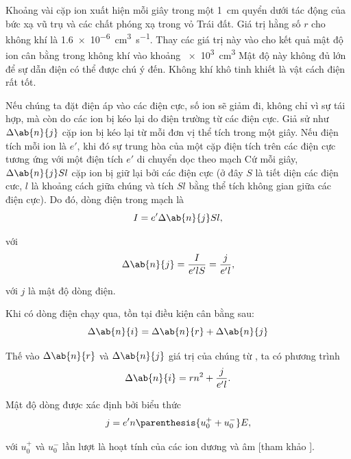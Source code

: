 Khoảng vài cặp ion xuất hiện mỗi giây trong một \SI{1}{\centi\metre} quyển dưới tác động của bức xạ vũ trụ và các chất phóng xạ trong vỏ Trái đất.
Giá trị hằng số $r$ cho không khí là \SI{1.6e-6}{\centi\metre\cubed\per\second}.
Thay các giá trị này vào  cho kết quả mật độ ion cân bằng trong không khí vào khoảng \SI{e3}{\centi\metre\cubed}
Mật độ này không đủ lớn để sự dẫn điện có thể được chú ý đến.
Không khí khô tinh khiết là vật cách điện rất tốt.

Nếu chúng ta đặt điện áp vào các điện cực, số ion sẽ giảm đi, không chỉ vì sự tái hợp, mà còn do các ion bị kéo lại do điện trường từ các điện cực.
Giả sử như $\Delta{\ab{n}{j}}$ cặp ion bị kéo lại từ mỗi đơn vị thể tích trong một giây.
Nếu điện tích mỗi ion là $e'$, khi đó sự trung hòa của một cặp điện tích trên các điện cực tương ứng với một điện tích $e'$ di chuyển dọc theo mạch
Cứ mỗi giây, $\Delta{\ab{n}{j}}Sl$ cặp ion bị giữ lại bởi các điện cực (ở đây $S$ là tiết diện các điện cưc, $l$ là khoảng cách giữa chúng và tích $Sl$ bằng thể tích không gian giữa các điện cực).
Do đó, dòng điện trong mạch là
\begin{equation*}
    I = e' \Delta{\ab{n}{j}} Sl,
\end{equation*}

\noindent
với
\begin{equation}\label{eq:12_4}
    \Delta{\ab{n}{j}} = \frac{I}{e' l S} = \frac{j}{e' l},
\end{equation}

\noindent
với $j$ là mật độ dòng điện.

Khi có dòng điện chạy qua, tồn tại điều kiện cân bằng sau:
\begin{equation*}
    \Delta{\ab{n}{i}} = \Delta{\ab{n}{r}} + \Delta{\ab{n}{j}}
\end{equation*}

\noindent
Thế vào $\Delta{\ab{n}{r}}$ và $\Delta{\ab{n}{j}}$ giá trị của chúng từ , ta có phương trình
\begin{equation}\label{eq:12_5}
    \Delta{\ab{n}{i}} = rn^2 + \frac{j}{e' l}.
\end{equation}

Mật độ dòng được xác định bởi biểu thức
\begin{equation}\label{eq:12_6}
    j = e' n \parenthesis{u_0^+ + u_0^-} E,
\end{equation}

\noindent
với $u_0^+$ và $u_0^-$ lần lượt là hoạt tính của các ion dương và âm [tham khảo ].

